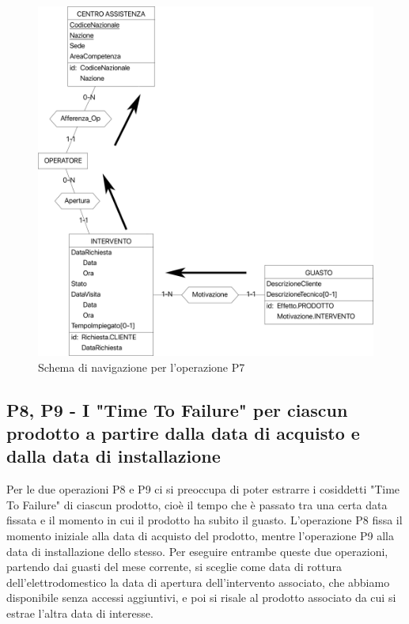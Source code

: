 \documentclass[a4paper, 12pt]{report}
\begin{document}
\begin{figure}[H]
	\centering
	\includegraphics[width=\linewidth]{images/P7.png}
	\caption{Schema di navigazione per l'operazione P7}
\end{figure}

\subsection{P8, P9 - I "Time To Failure" per ciascun prodotto a partire dalla data di acquisto e dalla data di installazione}

Per le due operazioni P8 e P9 ci si preoccupa di poter estrarre i cosiddetti "Time To Failure" di ciascun prodotto, cioè il
tempo che è passato tra una certa data fissata e il momento in cui il prodotto ha subito il guasto. L'operazione P8 fissa il momento iniziale alla data di acquisto
del prodotto, mentre l'operazione P9 alla data di installazione dello stesso. Per eseguire entrambe queste due operazioni, partendo dai guasti del mese corrente, si
sceglie come data di rottura dell'elettrodomestico la data di apertura dell'intervento associato, che abbiamo disponibile senza accessi aggiuntivi, e poi si risale
al prodotto associato da cui si estrae l'altra data di interesse.
\end{document}
